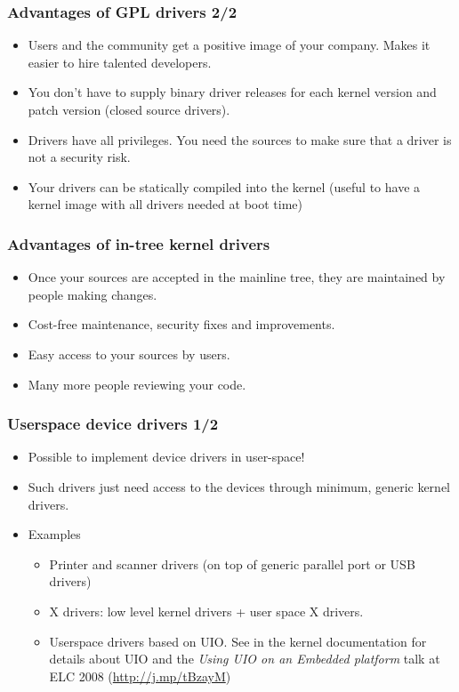 \begin{frame}
  \frametitle{Advantages of GPL drivers 2/2}
  \begin{itemize}
  \item Users and the community get a positive image of your
    company. Makes it easier to hire talented developers.
  \item You don't have to supply binary driver releases for each
    kernel version and patch version (closed source drivers).
  \item Drivers have all privileges. You need the sources to make sure
    that a driver is not a security risk.
  \item Your drivers can be statically compiled into the kernel
    (useful to have a kernel image with all drivers needed at boot time)
  \end{itemize}
\end{frame}

\begin{frame}
  \frametitle{Advantages of in-tree kernel drivers}
  \begin{itemize}
  \item Once your sources are accepted in the mainline tree, they are
    maintained by people making changes.
  \item Cost-free maintenance, security fixes and improvements.
  \item Easy access to your sources by users.
  \item Many more people reviewing your code.
  \end{itemize}
\end{frame}

\begin{frame}
  \frametitle{Userspace device drivers 1/2}
  \begin{itemize}
  \item Possible to implement device drivers in user-space!
  \item Such drivers just need access to the devices through minimum,
    generic kernel drivers.
  \item Examples
    \begin{itemize}
    \item Printer and scanner drivers (on top of generic parallel port
      or USB drivers)
    \item X drivers: low level kernel drivers + user space X drivers.
    \item Userspace drivers based on UIO. See 
      in the kernel documentation for details about UIO and the \emph{Using UIO on
        an Embedded platform} talk at ELC 2008
        (\url{http://j.mp/tBzayM})
    \end{itemize}
  \end{itemize}
\end{frame}

